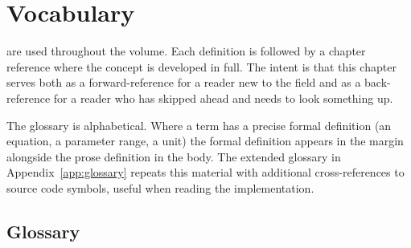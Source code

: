 \documentclass[twoside,nobib]{tufte-book}
\begin{document}
\chapter{Vocabulary}
\label{ch:vocab}

 are used throughout the
volume. Each definition is followed by a chapter reference where the
concept is developed in full. The intent is that this chapter
serves both as a forward-reference for a reader new to the field
and as a back-reference for a reader who has skipped ahead and
needs to look something up.

The glossary is alphabetical. Where a term has a precise formal
definition (an equation, a parameter range, a unit) the formal
definition appears in the margin alongside the prose definition in
the body. The extended glossary in
Appendix~\ref{app:glossary} repeats this material with additional
cross-references to source code symbols, useful when reading the
implementation.

\section{Glossary}
\end{document}
